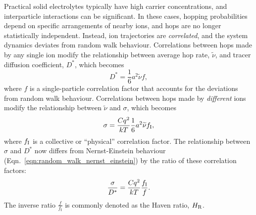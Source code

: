 \documentclass[aps,prb,twocolumn,superscriptaddress,reprint]{revtex4-1}
\newcommand{\hrpa}{{\widetilde{\nu}}}
\begin{document}
Practical solid electrolytes typically have high carrier concentrations, and interparticle interactions can be significant. 
In these cases, hopping probabilities depend on specific arrangements of nearby ions, and hops are no longer statistically independent. 
Instead, ion trajectories are \emph{correlated}, and the system dynamics deviates from random walk behaviour.\cite{BardeenAndHerring_Imperfections1952, CompaanAndHaven_TransFaradaySoc1958, AllnattAndLidiard_AtomicTransportInSolids,HowardAndLidiard_RepProgPhys1964} Correlations between hops made by any single ion modify the relationship between average hop rate, $\hrpa$, and tracer diffusion coefficient, $D^*$, which becomes
\begin{equation}
  D^* = \frac{1}{6}a^2\hrpa f,
  \label{eqn:correlated_diffusion}
\end{equation}
where $f$ is a single-particle correlation factor that accounts for the deviations from random walk behaviour. 
Correlations between hops made by \emph{different} ions modify the relationship between $\hrpa$ and $\sigma$, which becomes
\begin{equation}
  \sigma = \frac{Cq^2}{kT}\frac{1}{6}a^2\hrpa f_\m{I},
  \label{eqn:correlated_conductivity}
\end{equation}
where $f_{\mathrm{I}}$ is a collective or ``physical'' correlation factor.\cite{Mehrer_DiffusionBook, Murch_SolStatIonics1982,SatoAndKikuchi_JChemPhys1971} 
The relationship between $\sigma$ and $D^*$ now differs from Nernst-Einstein behaviour (Eqn.~\ref{eqn:random_walk_nernst_einstein}) by the ratio of these correlation factors:
\begin{equation}
  \frac{\sigma}{D^*} = \frac{Cq^2}{kT}\frac{f_{\mathrm{I}}}{f}.
  \label{eqn:correlated_nernst_einstein}
\end{equation}
The inverse ratio $\frac{f}{f_\mathrm{I}}$ is commonly denoted as the Haven ratio, $H_{\mathrm{R}}$\cite{Murch_SolStatIonics1982,Akbar_JApplPhys1994}.
\end{document}
